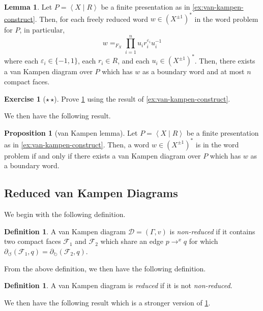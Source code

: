 \documentclass[11pt,a4paper,reqno]{amsart}
\theoremstyle{plain}
\theoremstyle{definition}
\newtheorem{lemma}[theorem]{Lemma}
\newtheorem{proposition}[theorem]{Proposition}
\newtheorem{definition}[theorem]{Definition}
\theoremstyle{definition}
\newtheorem{exercise}[theorem]{Exercise}
\newcommand\exerciseLevelMedium{$\star${\,}$\star$}
\begin{document}
\begin{lemma}\label{lem:van-kampen-construct}
  Let $P = \left\langle X\mid R \right\rangle$ be a finite presentation as in \cref{ex:van-kampen-construct}.
  Then, for each freely reduced word $w\in (X^{\pm 1})^*$ in the word problem for $P$, in particular,
	\[
		w
		=_{F_X}
		\prod_{i=1}^{n}
    u_i r_i^{\varepsilon_i} u_{i}^{-1}
	\]
  where
  each $\varepsilon_i\in \{-1,1\}$, each $r_i \in R$, and each $u_i\in (X^{\pm 1})^*$.
  Then, there exists a van Kampen diagram over $P$ which has $w$ as a boundary word and at most $n$ compact faces.
\end{lemma}
\begin{exercise}[\exerciseLevelMedium]
  Prove \cref{lem:van-kampen-construct} using the result of \cref{ex:van-kampen-construct}.
\end{exercise}

We then have the following result.

\begin{proposition}[van Kampen lemma]\label{prop:van-kampen-lemma}
  Let $P = \left\langle X\mid R \right\rangle$ be a finite presentation as in \cref{ex:van-kampen-construct}.
  Then, a word $w\in (X^{\pm 1})^*$ is in the word problem if and only if there exists a van Kampen diagram over $P$ which has $w$ as a boundary word.
\end{proposition}

\subsection{Reduced van Kampen Diagrams}

We begin with the following definition.

\begin{definition}\label{def:non-reduced}
  A van Kampen diagram $\mathcal D = (\Gamma, v)$ is \emph{non-reduced} if it contains two compact faces $\mathcal F_1$ and $\mathcal F_2$ which share an edge $p\to^x q$ for which $\partial_\circlearrowleft (\mathcal F_1,q) = \partial_\circlearrowright (\mathcal F_2,q)$.
\end{definition}

From the above definition, we then have the following definition.

\begin{definition}
  A van Kampen diagram is \emph{reduced} if it is not \emph{non-reduced}.
\end{definition}

We then have the following result which is a stronger version of \cref{prop:van-kampen-lemma}.
\end{document}

